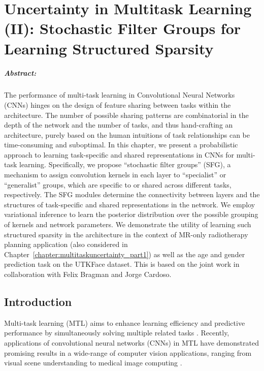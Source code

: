 \chapter{Uncertainty in Multitask Learning (II): Stochastic Filter Groups for Learning Structured Sparsity}\label{chapter:multitaskuncertainty_part2}

\paragraph{Abstract:} The performance of multi-task learning in Convolutional Neural Networks (CNNs) hinges on the design of feature sharing between tasks within the architecture. The number of possible sharing patterns are combinatorial in the depth of the network and the number of tasks, and thus hand-crafting an architecture, purely based on the human intuitions of task relationships can be time-consuming and suboptimal. In this chapter, we present a probabilistic approach to learning task-specific and shared representations in CNNs for multi-task learning. Specifically, we propose ``stochastic filter groups'' (SFG), a mechanism to assign convolution kernels in each layer to ``specialist'' or ``generalist'' groups, which are specific to or shared across different tasks, respectively. The SFG modules determine the connectivity between layers and the structures of task-specific and shared representations in the network. We employ variational inference to learn the posterior distribution over the possible grouping of kernels and network parameters. We demonstrate the utility of learning such structured sparsity in the architecture in the context of MR-only radiotherapy planning application (also considered in Chapter~\ref{chapter:multitaskuncertainty_part1}) as well as the age and gender prediction task on the UTKFace dataset. This is based on the joint work \cite{sfg2019} in collaboration with Felix Bragman and Jorge Cardoso.

\section{Introduction}
Multi-task learning (MTL) aims to enhance learning efficiency and predictive performance by simultaneously solving multiple related tasks \cite{caruana1997multitask}. Recently, applications of convolutional neural networks (CNNs) in MTL have demonstrated promising results in a wide-range of computer vision applications, ranging from visual scene understanding \cite{sermanet2014overfeat,eigen2015predicting,MisraCrossMTL16,kokkinos2017ubernet,ranjan2019hyperface,bilen2016integrated} to medical image computing \cite{moeskops2016deep,chen2016bridging,bragman2018multi,tanno2018autodvt}. 

